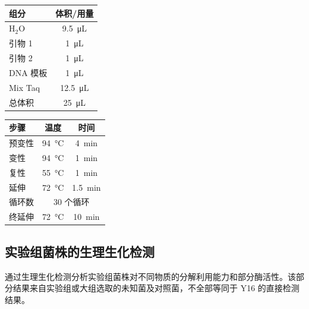 \documentclass[UTF8,a4paper,12pt,fontset=none]{ctexart}
\numberwithin{figure}{section}
\begin{document}
\begin{table}[H]
    \centering
    \begin{minipage}[t]{0.43\textwidth}
        \centering
        \begin{tabular}{lc}
            \toprule
            \textbf{组分} & \textbf{体积/用量} \\
            \midrule
            H$_2$O & \SI{9.5}{\micro\liter} \\
            引物 1 & \SI{1}{\micro\liter} \\
            引物 2 & \SI{1}{\micro\liter} \\
            DNA 模板 & \SI{1}{\micro\liter} \\
            Mix Taq & \SI{12.5}{\micro\liter} \\
            \midrule
            总体积 & \SI{25}{\micro\liter} \\
            \bottomrule
        \end{tabular}
        \label{tab:pcr_system}
    \end{minipage}
    \hfill
    \begin{minipage}[t]{0.52\textwidth}
        \centering
        \begin{tabular}{lcc}
            \toprule
            \textbf{步骤} & \textbf{温度} & \textbf{时间} \\
            \midrule
            预变性 & \SI{94}{\celsius} & \SI{4}{min} \\
            变性 & \SI{94}{\celsius} & \SI{1}{min} \\
            复性 & \SI{55}{\celsius} & \SI{1}{min} \\
            延伸 & \SI{72}{\celsius} & \SI{1.5}{min} \\
            循环数 & \multicolumn{2}{c}{30 个循环} \\
            终延伸 & \SI{72}{\celsius} & \SI{10}{min} \\
            \bottomrule
        \end{tabular}
        \label{tab:pcr_program}
    \end{minipage}
\end{table}

\subsection{实验组菌株的生理生化检测}

通过生理生化检测分析实验组菌株对不同物质的分解利用能力和部分酶活性。该部分结果来自实验组或大组选取的未知菌及对照菌，不全部等同于 Y16 的直接检测结果。
\end{document}

